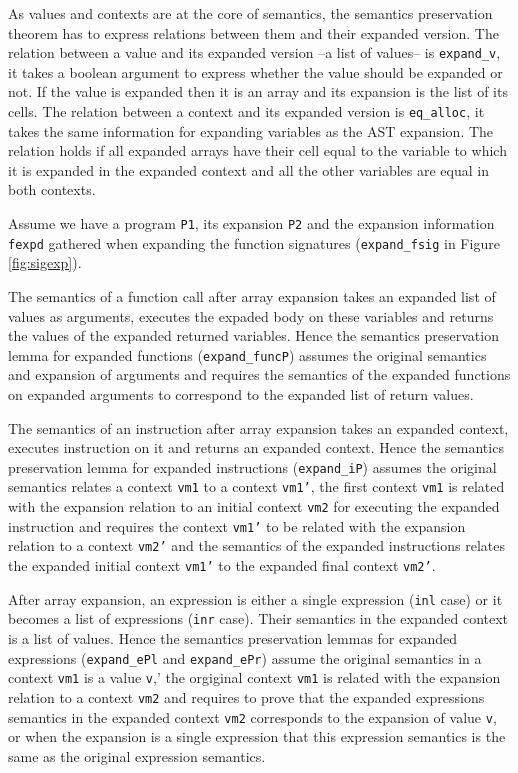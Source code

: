 \documentclass{article}
\begin{document}
As values and contexts are at the core of semantics, the semantics preservation
theorem has to express relations between them and their expanded version. The
relation between a value and its expanded version --a list of values-- is
\texttt{expand\_v}, it takes a boolean argument to express whether the value
should be expanded or not. If the value is expanded then it is an array and its
expansion is the list of its cells. The relation between a context and its
expanded version is \texttt{eq\_alloc}, it takes the same information for
expanding variables as the AST expansion. The relation holds if all expanded
arrays have their cell equal to the variable to which it is expanded in the
expanded context and all the other variables are equal in both contexts.

\medskip

Assume we have a program \texttt{P1}, its expansion \texttt{P2} and the
expansion information \texttt{fexpd} gathered when expanding the function
signatures (\texttt{expand\_fsig} in Figure \ref{fig:sigexp}).

\smallskip

The semantics of a function call after array expansion takes an expanded list
of values as arguments, executes the expaded body on these variables and returns
the values of the expanded returned variables. Hence the semantics preservation
lemma for expanded functions (\texttt{expand\_funcP}) assumes the original
semantics and expansion of arguments and requires the semantics of the expanded
functions on expanded arguments to correspond to the expanded list of return
values.

The semantics of an instruction after array expansion takes an expanded context,
executes instruction on it and returns an expanded context. Hence the semantics
preservation lemma for expanded instructions (\texttt{expand\_iP}) assumes the
original semantics relates a context \texttt{vm1} to a context \texttt{vm1'},
the first context \texttt{vm1} is related with the expansion relation to an
initial context \texttt{vm2} for executing the expanded instruction and requires
the context \texttt{vm1'} to be related with the expansion relation to a context
\texttt{vm2'} and the semantics of the expanded instructions relates the expanded
initial context \texttt{vm1'} to the expanded final context \texttt{vm2'}.

\smallskip

After array expansion, an expression is either a single expression (\texttt{inl}
case) or it becomes a list of expressions (\texttt{inr} case). Their semantics
in the expanded context is a list of values. Hence the semantics preservation
lemmas for expanded expressions (\texttt{expand\_ePl} and \texttt{expand\_ePr})
assume the original semantics in a context \texttt{vm1} is a value \texttt{v},'
the orgiginal context \texttt{vm1} is related with the expansion relation to a
context \texttt{vm2} and requires to prove that the expanded expressions
semantics in the expanded context \texttt{vm2} corresponds to the expansion of
value \texttt{v}, or when the expansion is a single expression that this
expression semantics is the same as the original expression semantics.
\end{document}
